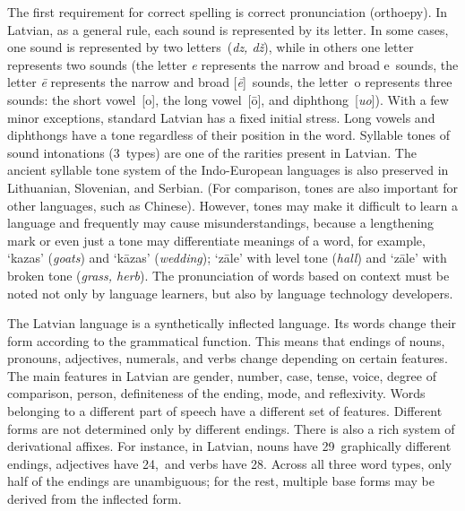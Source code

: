 \begin{multicols}{2}
The first requirement for correct spelling is correct pronunciation (orthoepy).  In Latvian, as a general rule, each sound is represented by its letter.  In some cases, one sound is represented by two letters~(\textit{dz, dž}), while in others one letter represents two sounds (the letter \textit{e} represents the narrow and broad e~sounds, the letter \textit{ē} represents the narrow and broad [\textit{ē}]~sounds, the letter~o represents three sounds: the short vowel~[o], the long vowel~[ō], and diphthong~[\textit{uo}]).  With a few minor exceptions, standard Latvian has a fixed initial stress.  Long vowels and diphthongs have a tone regardless of their position in the word.  Syllable tones of sound intonations (3~types) are one of the rarities present in Latvian. The ancient syllable tone system of the Indo-European languages is also preserved in Lithuanian, Slovenian, and Serbian.  (For comparison, tones are also important for other languages, such as Chinese).  However, tones may make it difficult to learn a language and frequently may cause misunderstandings, because a lengthening mark or even just a tone may differentiate meanings of a word, for example, `kazas' (\textit{goats}) and `kāzas' (\textit{wedding}); `zāle' with level tone (\textit{hall}) and `zāle' with broken tone (\textit{grass, herb}).  The pronunciation of words based on context must be noted not only by language learners, but also by language technology developers.


The Latvian language is a synthetically inflected language.  Its words change their form according to the grammatical function.  This means that endings of nouns, pronouns, adjectives, numerals, and verbs change depending on certain features.  The main features in Latvian are gender, number, case, tense, voice, degree of comparison, person, definiteness of the ending, mode, and reflexivity.  Words belonging to a different part of speech have a different set of features.  Different forms are not determined only by different endings.  There is also a rich system of derivational affixes.  For instance, in Latvian, nouns have 29~graphically different endings, adjectives have 24,~and verbs have 28.  Across all three word types, only half of the endings are unambiguous; for the rest, multiple base forms may be derived from the inflected form.


\end{multicols}
